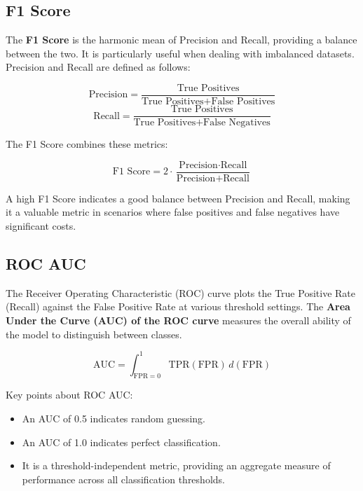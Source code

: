 \documentclass{article}%
\begin{document}
%
\subsection{F1 Score}%
\label{subsec:F1Score}%

                The \textbf{F1 Score} is the harmonic mean of Precision and Recall, providing a balance between the two. 
                It is particularly useful when dealing with imbalanced datasets. Precision and Recall are defined as follows:

                \[
                \text{Precision} = \frac{\text{True Positives}}{\text{True Positives} + \text{False Positives}}
                \]
                \[
                \text{Recall} = \frac{\text{True Positives}}{\text{True Positives} + \text{False Negatives}}
                \]

                The F1 Score combines these metrics:

                \[
                \text{F1 Score} = 2 \cdot \frac{\text{Precision} \cdot \text{Recall}}{\text{Precision} + \text{Recall}}
                \]

                A high F1 Score indicates a good balance between Precision and Recall, making it a valuable metric in scenarios where false positives 
                and false negatives have significant costs.
                

%
\subsection{ROC AUC}%
\label{subsec:ROCAUC}%

                The Receiver Operating Characteristic (ROC) curve plots the True Positive Rate (Recall) against the False Positive Rate at various threshold settings. 
                The \textbf{Area Under the Curve (AUC) of the ROC curve} measures the overall ability of the model to distinguish between classes. 

                \[
                \text{AUC} = \int_{\text{FPR}=0}^{1} \text{TPR}(\text{FPR}) \, d(\text{FPR})
                \]

                Key points about ROC AUC:
                \begin{itemize}
                    \item An AUC of 0.5 indicates random guessing.
                    \item An AUC of 1.0 indicates perfect classification.
                    \item It is a threshold-independent metric, providing an aggregate measure of performance across all classification thresholds.
                \end{itemize}
\end{document}
